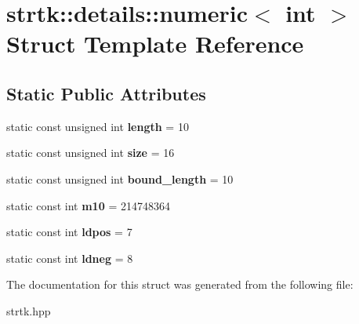 \hypertarget{structstrtk_1_1details_1_1numeric_3_01int_01_4}{\section{strtk\-:\-:details\-:\-:numeric$<$ int $>$ Struct Template Reference}
\label{structstrtk_1_1details_1_1numeric_3_01int_01_4}
}
\subsection*{Static Public Attributes}
\begin{DoxyCompactItemize}
\item 
\hypertarget{structstrtk_1_1details_1_1numeric_3_01int_01_4_a1c72ff10531397701480e0aaec7dd821}{static const unsigned int {\bfseries length} = 10}\label{structstrtk_1_1details_1_1numeric_3_01int_01_4_a1c72ff10531397701480e0aaec7dd821}

\item 
\hypertarget{structstrtk_1_1details_1_1numeric_3_01int_01_4_a4e16b5c73d916deb6893cd071fd0ac98}{static const unsigned int {\bfseries size} = 16}\label{structstrtk_1_1details_1_1numeric_3_01int_01_4_a4e16b5c73d916deb6893cd071fd0ac98}

\item 
\hypertarget{structstrtk_1_1details_1_1numeric_3_01int_01_4_ae82cf86e97e0ba1e5ec619bd84506b6e}{static const unsigned int {\bfseries bound\-\_\-length} = 10}\label{structstrtk_1_1details_1_1numeric_3_01int_01_4_ae82cf86e97e0ba1e5ec619bd84506b6e}

\item 
\hypertarget{structstrtk_1_1details_1_1numeric_3_01int_01_4_ad185de4c8579c64113d45ad686022020}{static const int {\bfseries m10} = 214748364}\label{structstrtk_1_1details_1_1numeric_3_01int_01_4_ad185de4c8579c64113d45ad686022020}

\item 
\hypertarget{structstrtk_1_1details_1_1numeric_3_01int_01_4_a60c642905cb4b802a64386d1e7a89e28}{static const int {\bfseries ldpos} = 7}\label{structstrtk_1_1details_1_1numeric_3_01int_01_4_a60c642905cb4b802a64386d1e7a89e28}

\item 
\hypertarget{structstrtk_1_1details_1_1numeric_3_01int_01_4_a85d9607694fd371e035587ad274534f3}{static const int {\bfseries ldneg} = 8}\label{structstrtk_1_1details_1_1numeric_3_01int_01_4_a85d9607694fd371e035587ad274534f3}

\end{DoxyCompactItemize}


The documentation for this struct was generated from the following file\-:\begin{DoxyCompactItemize}
\item 
strtk.\-hpp\end{DoxyCompactItemize}
